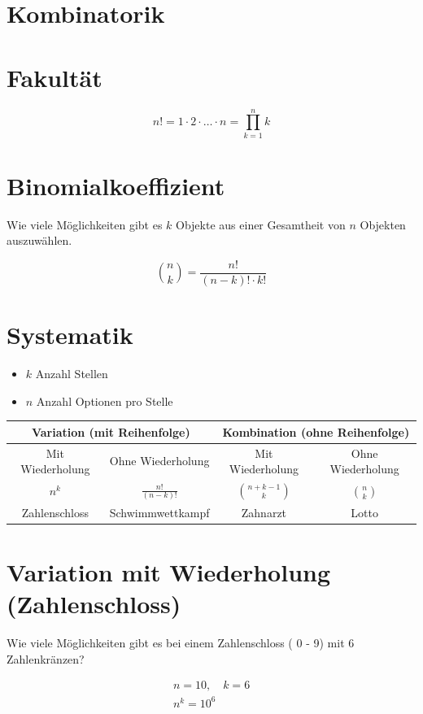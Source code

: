 \documentclass[10pt]{article}
\begin{document}
\section*{Kombinatorik}
\section*{Fakultät}
$$
n!=1 \cdot 2 \cdot \ldots \cdot n=\prod_{k=1}^{n} k
$$

\section*{Binomialkoeffizient}
Wie viele Möglichkeiten gibt es $k$ Objekte aus einer Gesamtheit von $n$ Objekten auszuwählen.

$$
\binom{n}{k}=\frac{n!}{(n-k)!\cdot k!}
$$

\section*{Systematik}
\begin{itemize}
  \item $k$ Anzahl Stellen
  \item $n$ Anzahl Optionen pro Stelle
\end{itemize}

\begin{center}
\begin{tabular}{|c|c|c|c|}
\hline
\multicolumn{2}{|c|}{Variation (mit Reihenfolge)} & \multicolumn{2}{c|}{Kombination (ohne Reihenfolge)} \\
\hline
Mit Wiederholung & Ohne Wiederholung & Mit Wiederholung & Ohne Wiederholung \\
\hline
$n^{k}$ & $\frac{n!}{(n-k)!}$ & $\binom{n+k-1}{k}$ & $\binom{n}{k}$ \\
\hline
Zahlenschloss & Schwimmwettkampf & Zahnarzt & Lotto \\
\hline
\end{tabular}
\end{center}

\section*{Variation mit Wiederholung (Zahlenschloss)}
Wie viele Möglichkeiten gibt es bei einem Zahlenschloss ( 0 - 9) mit 6 Zahlenkränzen?

$$
\begin{gathered}
n=10, \quad k=6 \\
n^{k}=10^{6}
\end{gathered}
$$
\end{document}
